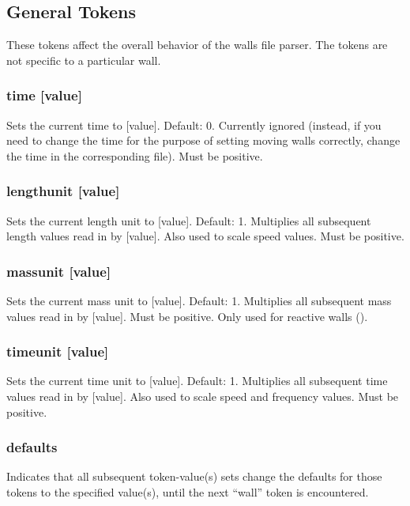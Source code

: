 \subsection{General Tokens}

These tokens affect the overall behavior of the walls file parser.
The tokens are not specific to a particular wall.

\subsubsection{time [value]}

Sets the current time to [value].  Default: 0.  Currently ignored
(instead, if you need to change the time for the purpose of setting
moving walls correctly, change the time in the corresponding 
file).  Must be positive.

\subsubsection{lengthunit [value]}

Sets the current length unit to [value].  Default: 1.  Multiplies all
subsequent length values read in by [value].  Also used to scale speed
values.  Must be positive.

\subsubsection{massunit [value]}

Sets the current mass unit to [value].  Default: 1.  Multiplies all
subsequent mass values read in by [value].  Must be positive.  Only
used for reactive walls ().

\subsubsection{timeunit [value]}

Sets the current time unit to [value].  Default: 1.  Multiplies all
subsequent time values read in by [value].  Also used to scale speed
and frequency values.  Must be positive.

\subsubsection{defaults}

Indicates that all subsequent token-value(s) sets change the defaults
for those tokens to the specified value(s), until the next ``wall''
token is encountered.

